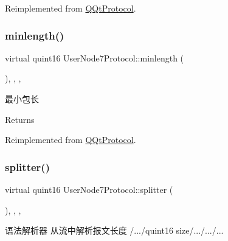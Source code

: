 Reimplemented from \mbox{\hyperlink{class_q_qt_protocol_af41bc3116abbbcfc9af45e151a253ff7}{Q\+Qt\+Protocol}}.

\mbox{\label{class_user_node7_protocol_abc693444bdac5a88d82065846ef9452d}} 
\subsubsection{\texorpdfstring{minlength()}{minlength()}}
{\footnotesize\ttfamily virtual quint16 User\+Node7\+Protocol\+::minlength (\begin{DoxyParamCaption}{ }\end{DoxyParamCaption})\hspace{0.3cm}{\ttfamily [inline]}, {\ttfamily [override]}, {\ttfamily [protected]}, {\ttfamily [virtual]}}



最小包长 

\begin{DoxyReturn}{Returns}

\end{DoxyReturn}


Reimplemented from \mbox{\hyperlink{class_q_qt_protocol_a2b00f53d3dd0eed817eeecff422891f3}{Q\+Qt\+Protocol}}.

\mbox{\label{class_user_node7_protocol_a4ce7d1a1d6684e05fafb0b52b7d117d7}} 
\subsubsection{\texorpdfstring{splitter()}{splitter()}}
{\footnotesize\ttfamily virtual quint16 User\+Node7\+Protocol\+::splitter (\begin{DoxyParamCaption}\item[{const Q\+Byte\+Array \&}]{ }\end{DoxyParamCaption})\hspace{0.3cm}{\ttfamily [inline]}, {\ttfamily [override]}, {\ttfamily [protected]}, {\ttfamily [virtual]}}



语法解析器 从流中解析报文长度 /.../quint16 size/.../.../... 


